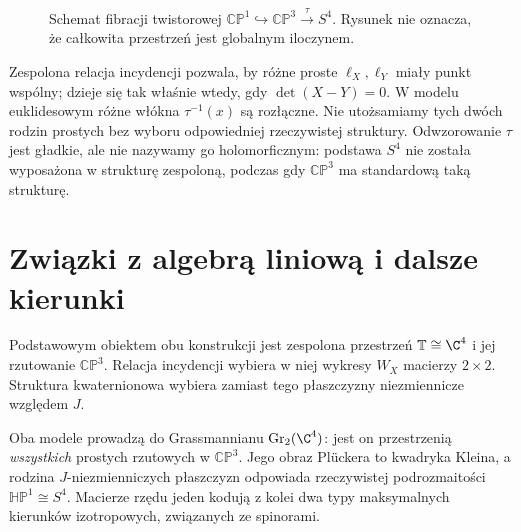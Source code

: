 \begin{figure}[!htbp]
\centering
{}
\caption{Schemat fibracji twistorowej
$\mathbb{CP}^1\hookrightarrow\mathbb{CP}^3
\xrightarrow{\tau}S^4$. Rysunek nie oznacza,
że całkowita przestrzeń jest globalnym iloczynem.}
\label{fig:lin32-fibracja}
\end{figure}

\begin{uwaga}
\label{rem:lin32-modele}
Zespolona relacja incydencji pozwala, by
różne proste $\ell_X,\ell_Y$ miały punkt wspólny;
dzieje się tak właśnie wtedy, gdy
$\det(X-Y)=0$. W modelu euklidesowym
różne włókna $\tau^{-1}(x)$ są rozłączne.
Nie utożsamiamy tych dwóch rodzin prostych
bez wyboru odpowiedniej rzeczywistej struktury.
Odwzorowanie $\tau$ jest gładkie,
ale nie nazywamy go holomorficznym:
podstawa $S^4$ nie została wyposażona
w strukturę zespoloną, podczas gdy
$\mathbb{CP}^3$ ma standardową taką strukturę.
\end{uwaga}

\section{Związki z algebrą liniową i dalsze kierunki}
\label{sec:lin32-wnioski}
Podstawowym obiektem obu konstrukcji jest
zespolona przestrzeń $\mathbb T\cong\C^4$
i jej rzutowanie $\mathbb{CP}^3$.
Relacja incydencji wybiera w niej
wykresy $W_X$ macierzy $2\times2$.
Struktura kwaternionowa wybiera zamiast
tego płaszczyzny niezmiennicze względem $J$.

Oba modele prowadzą do Grassmannianu
$\operatorname{Gr}_2(\C^4)$: jest on
przestrzenią \emph{wszystkich} prostych
rzutowych w $\mathbb{CP}^3$.
Jego obraz Plückera to kwadryka Kleina,
a rodzina $J$-niezmienniczych płaszczyzn
odpowiada rzeczywistej podrozmaitości
$\mathbb{HP}^1\cong S^4$.
Macierze rzędu jeden kodują z kolei
dwa typy maksymalnych kierunków
izotropowych, związanych ze spinorami.

